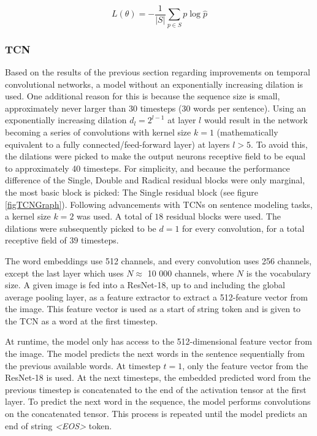 \documentclass[a4paper, twoside]{article}
\begin{document}
\begin{equation}
L(\theta) = -\frac{1}{|S|} \sum_{p \in S} p \log{\hat{p}}
\end{equation}

\subsubsection{TCN}
Based on the results of the previous section regarding improvements on temporal convolutional networks, a model without an exponentially increasing dilation is used. One additional reason for this is because the sequence size is small, approximately never larger than 30 timesteps (30 words per sentence). Using an exponentially increasing dilation $d_l = 2^{l-1}$ at layer $l$ would result in the network becoming a series of convolutions with kernel size $k=1$ (mathematically equivalent to a fully connected/feed-forward layer) at layers $l>5$. To avoid this, the dilations were picked to make the output neurons receptive field to be equal to approximately 40 timesteps. For simplicity, and because the performance difference of the Single, Double and Radical residual blocks were only marginal, the most basic block is picked: The Single residual block (see figure \ref{figTCNGraph}). 
Following \cite{tcn} advancements with TCNs on sentence modeling tasks, a kernel size $k=2$ was used. A total of $18$ residual blocks were used. The dilations were subsequently picked to be $d=1$ for every convolution, for a total receptive field of $39$ timesteps.

The word embeddings use 512 channels, and every convolution uses 256 channels, except the last layer which uses $N \approx $ 10 000 channels, where $N$ is the vocabulary size. A given image is fed into a ResNet-18, up to and including the global average pooling layer, as a feature extractor to extract a 512-feature vector from the image. This feature vector is used as a start of string token and is given to the TCN as a word at the first timestep.

At runtime, the model only has access to the 512-dimensional feature vector from the image. The model predicts the next words in the sentence sequentially from the previous available words. At timestep $t=1$, only the feature vector from the ResNet-18 is used. At the next timesteps, the embedded predicted word from the previous timestep is concatenated to the end of the activation tensor at the first layer. To predict the next word in the sequence, the model performs convolutions on the concatenated tensor. This process is repeated until the model predicts an end of string \textit{<EOS>} token.
\end{document}
